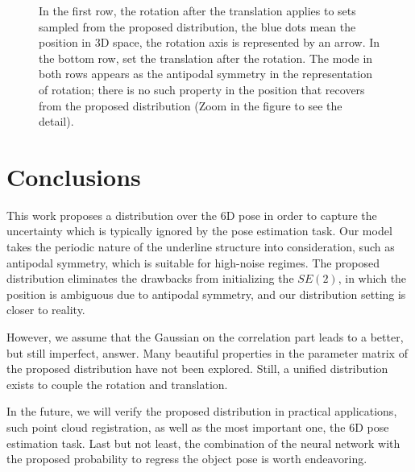 \documentclass[micromachines,article,accept,pdftex,moreauthors]{Definitions/mdpi}
\begin{document}
\begin{figure}[H]
{        \label{fig:transformation:4}
    }
\caption{In the first row, the rotation after the translation applies to sets sampled from the proposed distribution, the blue dots mean the position in 3D space, the rotation axis is represented by an arrow. In the bottom row, set the translation after the rotation. The mode in both rows appears as the antipodal symmetry in the representation of rotation; there is no such property in the position that recovers from the proposed distribution ({Zoom in the figure to see the detail}).} \label{fig:transformed_samples}
\end{figure}


\section{Conclusions} \label{5}
This work proposes a distribution over the 6D pose in order to capture the uncertainty which is typically ignored by the pose estimation task. Our model takes the periodic nature of the underline structure into consideration, such as antipodal symmetry, which is suitable for high-noise regimes. The proposed distribution eliminates the drawbacks from initializing the $SE(2)$, in which the position is ambiguous due to antipodal symmetry, and our distribution setting is closer to reality.

However, we assume that the Gaussian on the correlation part leads to a better, but still imperfect, answer. Many beautiful properties in the parameter matrix of the proposed distribution have not been explored. {Still, a unified distribution exists to couple the rotation and translation.}

In the future, we will verify the proposed distribution in practical applications, such point cloud registration, as well as the most important one, the 6D pose estimation task.  {Last but not least, the combination of {the neural network} with the proposed probability to regress the object pose is worth endeavoring.}

\vspace{6pt} 

\end{document}
